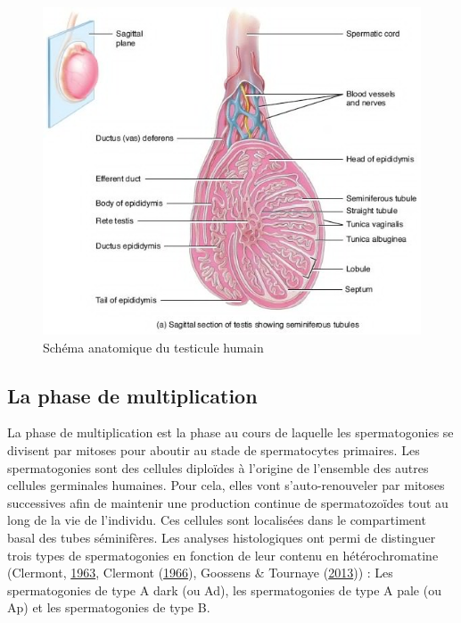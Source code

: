 \documentclass[12pt,twoside]{reedthesis}
\theoremstyle{definition}
\theoremstyle{definition}
\theoremstyle{remark}
\begin{document}
  \begin{figure}
  
  {\centering \includegraphics[scale=0.65]{figure/coupe_testicule2} 
  
  }
  
  \caption{Schéma anatomique du testicule humain}\label{fig:testicule}
  \end{figure}
  
  \newpage
  
  \subsection{La phase de
  multiplication}\label{la-phase-de-multiplication}
  
  La phase de multiplication est la phase au cours de laquelle les
  spermatogonies se divisent par mitoses pour aboutir au stade de
  spermatocytes primaires. Les spermatogonies sont des cellules diploïdes
  à l'origine de l'ensemble des autres cellules germinales humaines. Pour
  cela, elles vont s'auto-renouveler par mitoses successives afin de
  maintenir une production continue de spermatozoïdes tout au long de la
  vie de l'individu. Ces cellules sont localisées dans le compartiment
  basal des tubes séminifères. Les analyses histologiques ont permi de
  distinguer trois types de spermatogonies en fonction de leur contenu en
  hétérochromatine (Clermont, \protect\hyperlink{ref-Clermont1963}{1963},
  Clermont (\protect\hyperlink{ref-Clermont1966}{1966}), Goossens \&
  Tournaye (\protect\hyperlink{ref-Goossens2013}{2013})) : Les
  spermatogonies de type A dark (ou Ad), les spermatogonies de type A pale
  (ou Ap) et les spermatogonies de type B.
  
\end{document}
